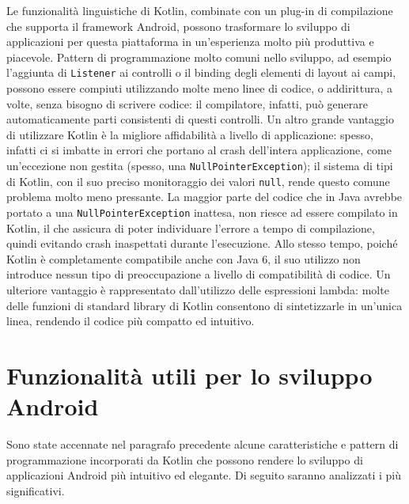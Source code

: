 Le funzionalità linguistiche di Kotlin, combinate con un plug-in di compilazione che supporta il framework Android, possono trasformare lo sviluppo di applicazioni per questa piattaforma in un'esperienza molto più produttiva e piacevole. Pattern di programmazione molto comuni nello sviluppo, ad esempio l'aggiunta di \texttt{Listener} ai controlli o il binding degli elementi di layout ai campi, possono essere compiuti utilizzando molte meno linee di codice, o addirittura, a volte, senza bisogno di scrivere codice: il compilatore, infatti, può generare automaticamente parti consistenti di questi controlli. Un altro grande vantaggio di utilizzare Kotlin è la migliore affidabilità a livello di applicazione: spesso, infatti ci si imbatte in errori che portano al crash dell’intera applicazione, come un'eccezione non gestita (spesso, una \texttt{NullPointerException}); il sistema di tipi di Kotlin, con il suo preciso monitoraggio dei valori \texttt{null}, rende questo comune problema molto meno pressante. La maggior parte del codice che in Java avrebbe portato a una \texttt{NullPointerException} inattesa, non riesce ad essere compilato in Kotlin, il che assicura di poter individuare l'errore a tempo di compilazione, quindi evitando crash inaspettati durante l'esecuzione. Allo stesso tempo, poiché Kotlin è completamente compatibile anche con Java 6, il suo utilizzo non introduce nessun tipo di preoccupazione a livello di compatibilità di codice. Un ulteriore vantaggio è rappresentato dall’utilizzo delle espressioni lambda: molte delle funzioni di standard library di Kotlin consentono di sintetizzarle in un’unica linea, rendendo il codice più compatto ed intuitivo.\\

\section{Funzionalità utili per lo sviluppo Android}
Sono state accennate nel paragrafo precedente alcune caratteristiche e pattern di programmazione incorporati da Kotlin che possono rendere lo sviluppo di applicazioni Android più intuitivo ed elegante. Di seguito saranno analizzati i più significativi.\\

